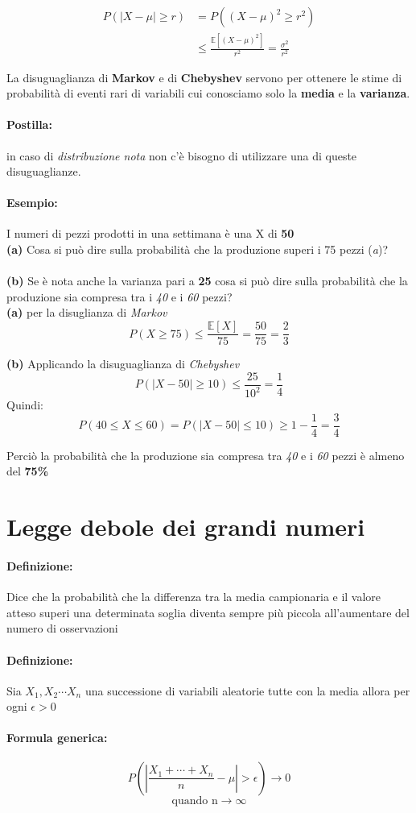 \documentclass[]{article}
\newcommand{\ev}{\mathbb{E}[X]}
\renewcommand{\ev}[1]{\mathbb{E}[#1]}
\newcommand{\definizione}{\paragraph{Definizione:}}
\newcommand{\formula}{\paragraph{Formula generica:}}
\begin{document}
    \begin{equation*}
        \begin{split}
            P(|X - \mu | \geq r) & = P((X - \mu)^2 \geq r^2) \\
            & \leq \frac{\ev{(X - \mu)^2}}{r^2} = \frac{\sigma^2}{r^2}
        \end{split}
    \end{equation*}
    \linebreak
 
    La disuguaglianza di \textbf{Markov} e di \textbf{Chebyshev} servono per ottenere le stime di probabilità di eventi rari di variabili
    cui conosciamo solo la \textbf{media} e la \textbf{varianza}.

    \paragraph{Postilla:} in caso di \textit{distribuzione nota} non c'è bisogno di utilizzare una di queste disuguaglianze.

    \paragraph{Esempio:} I numeri di pezzi prodotti in una settimana è una X di \textbf{50} \\
    \textbf{(a)} Cosa si può dire sulla probabilità che la produzione superi i 75 pezzi (\textit{a})? \\ \\
    \textbf{(b)} Se è nota anche la varianza pari a \textbf{25} cosa si può dire sulla probabilità che la produzione sia compresa tra i \textit{40} e i \textit{60} pezzi? \\
    \linebreak[4]
    \textbf{(a)} per la disuglianza di \textit{Markov}
    \[ P(X \geq 75) \leq \frac{\ev{X}}{75} = \frac{50}{75} = \frac{2}{3}\]

    \textbf{(b)} Applicando la disuguaglianza di \textit{Chebyshev}
    \[ P(|X - 50| \geq 10) \leq \frac{25}{10^2} = \frac{1}{4}\]
    Quindi:
    \[ P(40 \leq X \leq 60) = P(|X - 50| \leq 10) \geq 1 - \frac{1}{4} = \frac{3}{4}\]

    Perciò la probabilità che la produzione sia compresa tra \textit{40} e i \textit{60} pezzi è almeno del \textbf{75\%}
    \newpage
    \section{Legge debole dei grandi numeri}
    \definizione Dice che la probabilità che la differenza tra la media campionaria e il valore atteso superi una determinata soglia diventa sempre più piccola all'aumentare del numero di osservazioni
    \definizione Sia $X_1, X_2 \cdots X_n$ una successione di variabili aleatorie tutte con la media \boldsymbol{$\ev{X_i} =: \mu$} allora per ogni $\epsilon > 0$ 
    \formula
    \[ P(|\frac{X_1 + \cdots + X_n}{n} - \mu | > \epsilon) \longrightarrow 0 \] 
    \[ \text{quando n} \longrightarrow \infty \]
\end{document}
